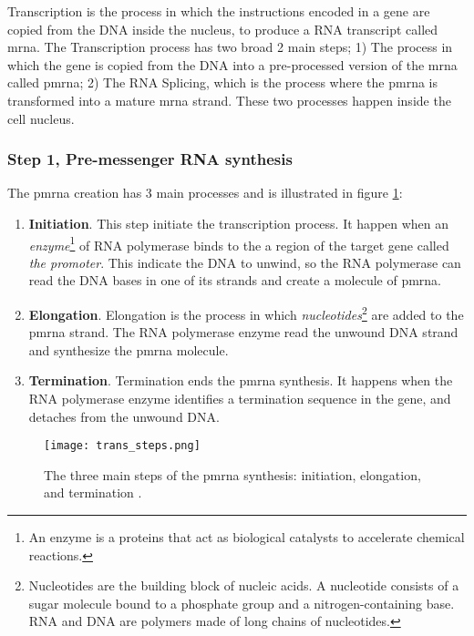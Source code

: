 
\glsresetall
\graphicspath{{./Sections/Basics/Resources/}}

Transcription is the process in which the instructions encoded in a gene are copied from the DNA inside the nucleus, to produce a RNA transcript called \acrlong{mrna}. The Transcription process has two broad 2 main steps; 1) The process in which the gene is copied from the DNA into a pre-processed version of the \gls{mrna} called \gls{pmrna}; 2) The RNA Splicing, which is the process where the \gls{pmrna} is transformed into a mature \gls{mrna} strand. These two processes happen inside the cell nucleus.

\subsubsection{Step 1, Pre-messenger RNA synthesis}
The \gls{pmrna} creation has 3 main processes\cite{MolecularWatson} and is illustrated in figure \ref{fig:BB:premrna_synth}:

\begin{enumerate}
  \item \textbf{Initiation}. This step initiate the transcription process. It happen when an \textit{enzyme}\footnote{An enzyme is a proteins that act as biological catalysts to accelerate chemical reactions.} of RNA polymerase binds to the a region of the target gene called \textit{the promoter}. This indicate the DNA to unwind, so the RNA polymerase can read the DNA bases in one of its strands and create a molecule of \gls{pmrna}.
  \item \textbf{Elongation}. Elongation is the process in which \textit{nucleotides}\footnote{Nucleotides are the building block of nucleic acids. A nucleotide consists of a sugar molecule bound to a phosphate group and a nitrogen-containing base. RNA and DNA are polymers made of long chains of nucleotides.} are added to the \gls{pmrna} strand. The RNA polymerase enzyme read the unwound DNA strand and synthesize the \gls{pmrna} molecule.
  \item \textbf{Termination}. Termination ends the \gls{pmrna} synthesis. It happens when the RNA polymerase enzyme identifies a termination sequence in the gene, and detaches from the unwound DNA.
\end{enumerate}

\begin{figure}[htb]
  \centering
  \texttt{[image: trans\_steps.png]}
  \caption{The three main steps of the \gls{pmrna} synthesis: initiation, elongation, and termination \cite{transcription_steps}.}
  \label{fig:BB:premrna_synth}
\end{figure}

